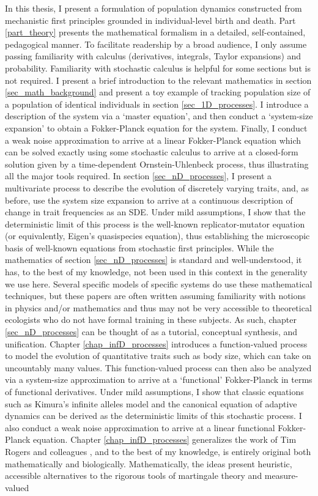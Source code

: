 In this thesis, I present a formulation of population dynamics constructed from mechanistic first principles grounded in individual-level birth and death. Part \ref{part_theory} presents the mathematical formalism in a detailed, self-contained, pedagogical manner. To facilitate readership by a broad audience, I only assume passing familiarity with calculus (derivatives, integrals, Taylor expansions) and probability. Familiarity with stochastic calculus is helpful for some sections but is not required. I present a brief introduction to the relevant mathematics in section \ref{sec_math_background} and present a toy example of tracking population size of a population of identical individuals in section \ref{sec_1D_processes}. I introduce a description of the system via a `master equation', and then conduct a `system-size expansion' to obtain a Fokker-Planck equation for the system. Finally, I conduct a weak noise approximation to arrive at a linear Fokker-Planck equation which can be solved exactly using some stochastic calculus to arrive at a closed-form solution given by a time-dependent Ornstein-Uhlenbeck process, thus illustrating all the major tools required. In section \ref{sec_nD_processes}, I present a multivariate process to describe the evolution of discretely varying traits, and, as before, use the system size expansion to arrive at a continuous description of change in trait frequencies as an SDE. Under mild assumptions, I show that the deterministic limit of this process is the well-known replicator-mutator equation (or equivalently, Eigen's quasispecies equation), thus establishing the microscopic basis of well-known equations from stochastic first principles. While the mathematics of section \ref{sec_nD_processes} is standard and well-understood, it has, to the best of my knowledge, not been used in this context in the generality we use here. Several specific models of specific systems do use these mathematical techniques, but these papers are often written assuming familiarity with notions in physics and/or mathematics and thus may not be very accessible to theoretical ecologists who do not have formal training in these subjects. As such, chapter \ref{sec_nD_processes} can be thought of as a tutorial, conceptual synthesis, and unification. Chapter \ref{chap_infD_processes} introduces a function-valued process to model the evolution of quantitative traits such as body size, which can take on uncountably many values. This function-valued process can then also be analyzed via a system-size approximation to arrive at a `functional' Fokker-Planck in terms of functional derivatives. Under mild assumptions, I show that classic equations such as Kimura's infinite alleles model and the canonical equation of adaptive dynamics can be derived as the deterministic limits of this stochastic process. I also conduct a weak noise approximation to arrive at a linear functional Fokker-Planck equation. Chapter \ref{chap_infD_processes} generalizes the work of Tim Rogers and colleagues \citep{rogers_demographic_2012,rogers_spontaneous_2012,rogers_modes_2015}, and to the best of my knowledge, is entirely original both mathematically and biologically. Mathematically, the ideas present heuristic, accessible alternatives to the rigorous tools of martingale theory and measure-valued 